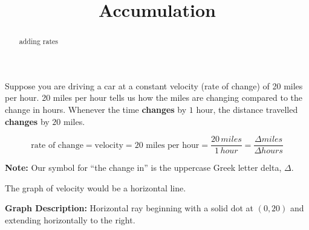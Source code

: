 \documentclass{ximera}
\title{Accumulation}
\begin{document}
\begin{abstract}
adding rates
\end{abstract}
\maketitle





Suppose you are driving a car at a constant velocity (rate of change) of 20 miles per hour. 20 miles per hour tells us how the miles are changing compared to the change in hours.  Whenever the time \textbf{\textcolor{purple!85!blue}{changes}} by $1$ hour, the distance travelled \textbf{\textcolor{purple!85!blue}{changes}} by $20$ miles.

\[
\text{rate of change} = \text{velocity} = \text{20 miles per hour} = \frac{20 \, miles}{1 \, hour} = \frac{\Delta miles}{\Delta hours}
\]

\textbf{Note:} Our symbol for ``the change in'' is the uppercase Greek letter delta, $\Delta$. 

The graph of velocity would be a horizontal line.



\begin{image}
\end{image}

\textcolor{gray!90}{\textbf{Graph Description:} Horizontal ray beginning with a solid dot at $(0,20)$ and extending horizontally to the right.}
\end{document}
